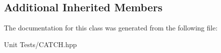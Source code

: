 \subsection*{Additional Inherited Members}


The documentation for this class was generated from the following file\+:\begin{DoxyCompactItemize}
\item 
Unit Tests/C\+A\+T\+C\+H.\+hpp\end{DoxyCompactItemize}
